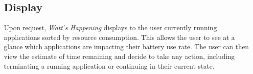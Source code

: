 \subsection{Display} %
Upon request, \emph{Watt's Happening} displays to the user currently running applications sorted by resource consumption.
This allows the user to see at a glance which applications are impacting their battery use rate. %
The user can then view the estimate of time remaining and decide to take any action, including terminating a running application or continuing in their current state.

